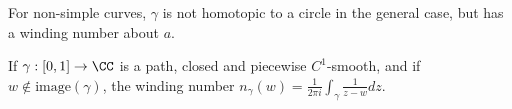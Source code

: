 For non-simple curves, $\gamma$ is not homotopic to a circle in the general case, but has a winding number about $a$.

\begin{definition}
  If $\gamma  : [0, 1] \rightarrow \CC$ is a path, closed and piecewise $C^1$-smooth, and if $w \not\in \mathrm{image}(\gamma)$, the winding number $n_\gamma(w) = \frac{1}{2 \pi i}\int_\gamma \frac{1}{z - w} dz$.
\end{definition}


